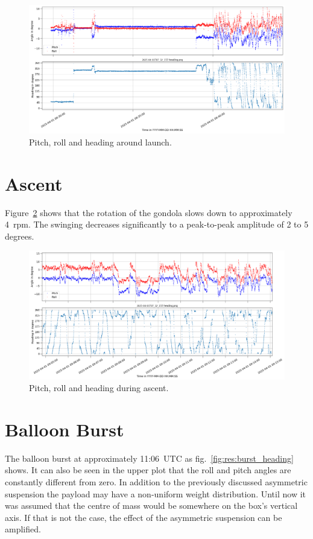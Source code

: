 \begin{figure}[H]
    \centering
    \includegraphics[width=\linewidth]{images/05_flight_data/launch_heading.png}
    \caption[Heading at launch.]{Pitch, roll and heading around launch.}
    \label{fig:res:launch_heading}
\end{figure}


\section{Ascent \label{sec:ascent}}
Figure~\ref{fig:res:ascent_heading} shows that the rotation of the gondola slows down to approximately 4~rpm. The swinging decreases significantly to a peak-to-peak amplitude of 2 to 5 degrees.

\begin{figure}[H]
    \centering
    \includegraphics[width=\linewidth]{images/05_flight_data/mid_flight_heading.png}
    \caption[Heading during ascent.]{Pitch, roll and heading during ascent.}
    \label{fig:res:ascent_heading}
\end{figure}


\section{Balloon Burst \label{sec:balloon_burst}}
The balloon burst at approximately 11:06~UTC as fig.~\ref{fig:res:burst_heading} shows. It can also be seen in the upper plot that the roll and pitch angles are constantly different from zero. In addition to the previously discussed asymmetric suspension the payload may have a non-uniform weight distribution. Until now it was assumed that the centre of mass would be somewhere on the box's vertical axis. If that is not the case, the effect of the asymmetric suspension can be amplified.

